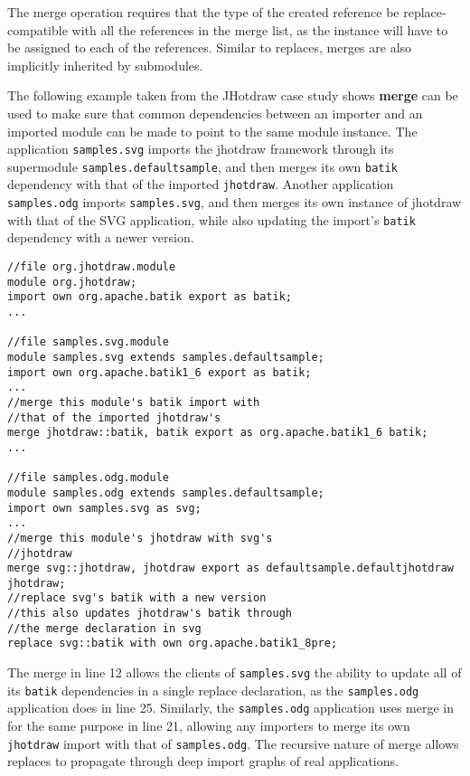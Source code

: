 The merge operation requires that the type of the created reference be 
replace-compatible with all the references in the merge list, as the instance will
have to be assigned to each of the references. Similar to replaces, merges 
are also implicitly inherited by submodules.

The following example taken from the JHotdraw case study shows \textbf{merge}
can be used to make sure that common dependencies between an importer and
an imported module can be made to point to the same module instance. The
application \texttt{samples.svg} imports the jhotdraw framework through
its supermodule \texttt{samples.defaultsample}, and then merges
its own \texttt{batik} dependency with that of the imported \texttt{jhotdraw}.
Another application \texttt{samples.odg} imports \texttt{samples.svg}, 
and then merges its own instance of jhotdraw with that of the SVG application, 
while also updating the import's \texttt{batik} dependency with a newer version.

\begin{lstlisting}[caption=Merge]
//file org.jhotdraw.module
module org.jhotdraw;
import own org.apache.batik export as batik;
...

//file samples.svg.module
module samples.svg extends samples.defaultsample;
import own org.apache.batik1_6 export as batik;
...
//merge this module's batik import with
//that of the imported jhotdraw's
merge jhotdraw::batik, batik export as org.apache.batik1_6 batik;
...

//file samples.odg.module
module samples.odg extends samples.defaultsample;
import own samples.svg as svg;
...
//merge this module's jhotdraw with svg's
//jhotdraw
merge svg::jhotdraw, jhotdraw export as defaultsample.defaultjhotdraw jhotdraw;
//replace svg's batik with a new version
//this also updates jhotdraw's batik through
//the merge declaration in svg
replace svg::batik with own org.apache.batik1_8pre;
\end{lstlisting}


The merge in line 12 allows the clients of \texttt{samples.svg}
the ability to update all of its \texttt{batik} dependencies
in a single replace declaration, as the \texttt{samples.odg}
application does in line 25. Similarly, the \texttt{samples.odg} application
uses merge in for the same purpose in line 21, allowing any importers
to merge its own \texttt{jhotdraw} import with that of \texttt{samples.odg}.
The recursive nature of merge allows replaces to propagate through deep
import graphs of real applications. 

